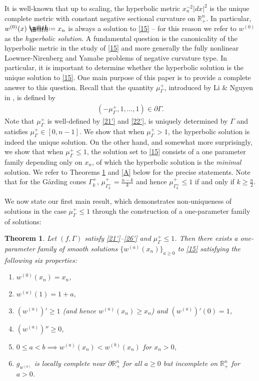 \documentclass[12pt]{article}
\makeatletter
\numberwithin{equation}{section}
\theoremstyle{plain}
\newtheorem{thm}{Theorem}[section]
\theoremstyle{definition}
\newcommand*{\defeq}{\mathrel{\rlap{%
			\raisebox{0.3ex}{$\m@th\cdot$}}%
		\raisebox{-0.3ex}{$\m@th\cdot$}}%
	=}
\makeatother
\begin{document}
It is well-known that up to scaling, the hyperbolic metric $x_n^{-2}|dx|^2$ is the unique complete metric with constant negative sectional curvature on $\mathbb{R}^n_+$. In particular, $w^{(0)}(x) \defeq x_n$ is always a solution to \eqref{15} -- for this reason we refer to $w^{(0)}$ as the \textit{hyperbolic solution}. A fundamental question is the canonicality of the hyperbolic metric in the study of \eqref{15} and more generally the fully nonlinear Loewner-Nirenberg and Yamabe problems of negative curvature type. In particular, it is important to determine whether the hyperbolic solution is the unique solution to \eqref{15}. One main purpose of this paper is to provide a complete answer to this question. Recall that the quantity $\mu_\Gamma^+$, introduced by Li \& Nguyen in \cite{LN14b}, is defined by
\begin{align}\label{220}
(-\mu_\Gamma^+,1,\dots,1)\in\partial\Gamma.
\end{align}
Note that $\mu_\Gamma^+$ is well-defined by \eqref{21'} and \eqref{22'}, is uniquely determined by $\Gamma$ and satisfies $\mu_\Gamma^+\in[0,n-1]$. We show that when $\mu_\Gamma^+>1$, the hyperbolic solution is indeed the unique solution. On the other hand, and somewhat more surprisingly, we show that when $\mu_\Gamma^+ \leq 1$, the solution set to \eqref{15} consists of a one parameter family depending only on $x_n$, of which the hyperbolic solution is the \textit{minimal} solution. We refer to Theorems \ref{B} and \ref{A} below for the precise statements. Note that for the G{\aa}rding cones $\Gamma_k^+$,  $\mu_{\Gamma_k^+}^+ = \frac{n-k}{k}$ and hence $\mu_{\Gamma_k^+}^+ \leq 1$ if and only if $k\geq \frac{n}{2}$. \medskip 

We now state our first main result, which demonstrates non-uniqueness of solutions in the case $\mu_\Gamma^+ \leq 1$ through the construction of a one-parameter family of solutions:

\begin{thm}\label{B}
	Let $(f,\Gamma)$ satisfy \eqref{21'}--\eqref{26'} and $\mu_\Gamma^+ \leq 1$. Then there exists a one-parameter family of smooth solutions $\{w^{(a)}(x_n)\}_{a\geq 0}$ to \eqref{15} satisfying the following six properties:\smallskip
		\begin{enumerate}
		\item $w^{(0)}(x_n) = x_n$,\smallskip
		\item $w^{(a)}(1) = 1+a$,\smallskip
		\item $(w^{(a)})' \geq 1$ (and hence $w^{(a)}(x_n) \geq x_n$) and $(w^{(a)})'(0)=1$,\smallskip
		\item $(w^{(a)})'' \geq 0$,\smallskip
		\item $0 \leq a<b \implies w^{(a)}(x_n) < w^{(b)}(x_n)$ for $x_n >0$,\smallskip
		\item $g_{w^{(a)}}$ is locally complete near $\partial\mathbb{R}_+^n$ for all $a \geq 0$ but incomplete on $\mathbb{R}_+^n$ for $a>0$. 
		\end{enumerate}
\end{thm}
\end{document}
